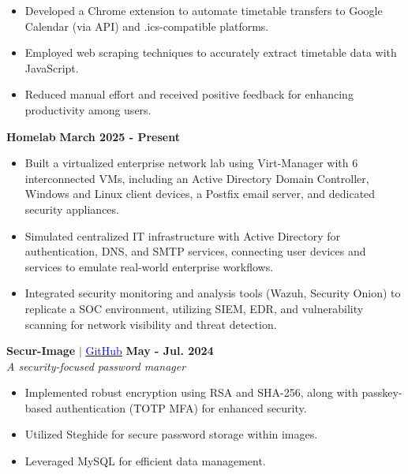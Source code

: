 \documentclass[letterpaper,11pt]{article}
\begin{document}
\begin{itemize}[labelsep=1em, itemsep=0pt, topsep=0pt]
  \item[$\bullet$] Developed a Chrome extension to automate timetable transfers to Google Calendar (via API) and .ics-compatible platforms.
  \item[$\bullet$] Employed web scraping techniques to accurately extract timetable data with JavaScript.
  \item[$\bullet$] Reduced manual effort and received positive feedback for enhancing productivity among users.
\end{itemize}

\vspace{1pt}  %

\textbf{Homelab}
\hfill \textbf{March 2025 - Present} \\

\begin{itemize}[labelsep=1em, itemsep=0pt, topsep=0pt]
  \item[$\bullet$] Built a virtualized enterprise network lab using Virt-Manager with 6 interconnected VMs, including an Active Directory Domain Controller, Windows and Linux client devices, a Postfix email server, and dedicated security appliances.
  \item[$\bullet$] Simulated centralized IT infrastructure with Active Directory for authentication, DNS, and SMTP services, connecting user devices and services to emulate real-world enterprise workflows.
  \item[$\bullet$] Integrated security monitoring and analysis tools (Wazuh, Security Onion) to replicate a SOC environment, utilizing SIEM, EDR, and vulnerability scanning for network visibility and threat detection.
\end{itemize}

\vspace{1pt}  %

\textbf{Secur-Image} $\vert$ \href{https://github.com/sycanz04/secur-image}{\textcolor{blue}{\underline{GitHub}}} \hfill \textbf{May - Jul. 2024} \\
\textit{A security-focused password manager} \\

\begin{itemize}[labelsep=1em, itemsep=0pt, topsep=0pt]
  \item[$\bullet$] Implemented robust encryption using RSA and SHA-256, along with passkey-based authentication (TOTP MFA) for enhanced security.
  \item[$\bullet$] Utilized Steghide for secure password storage within images.
  \item[$\bullet$] Leveraged MySQL for efficient data management.
\end{itemize}
\end{document}
